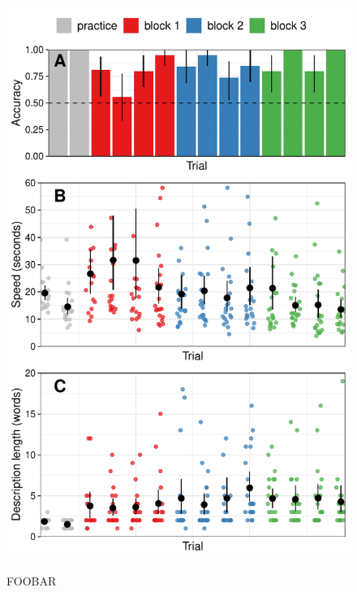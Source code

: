 \documentclass[11pt,a4paper]{article}
\begin{document}
	\begin{figure}
		\begin{minipage}{.5\textwidth}
			{	\includegraphics[width=\textwidth]{plot1.pdf}} 
			\begin{small}
				FOOBAR
				
			\end{small}
			

\end{minipage}
\end{figure}
\end{document}
